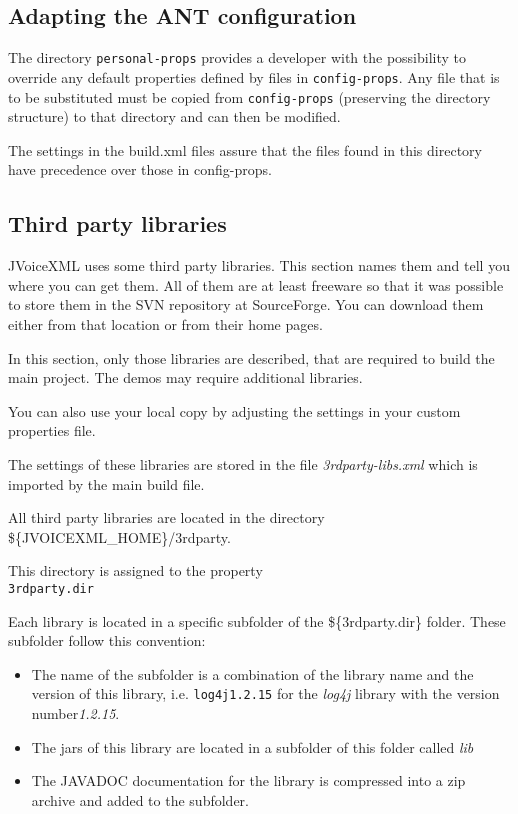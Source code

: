 \documentclass[11pt,a4paper]{article}
\begin{document}
\subsection{Adapting the ANT configuration}

The directory \texttt{personal-props} provides a developer with the 
possibility to override any 
default properties defined by files in \texttt{config-props}. 
Any file that is to be
substituted must be copied from \texttt{config-props} 
(preserving the directory structure) to that directory and can then be 
modified.

The settings in the build.xml files assure that the files
found in this directory have precedence over those in config-props.

\subsection{Third party libraries}
\label{sec:third-party-libr}

JVoiceXML uses some third party libraries. This section names them and tell
you where you can get them. All of them are at least freeware
so that it was possible to store them in the SVN repository at
SourceForge. You can download them either from that location or
from their home pages. 

In this section, only those libraries are described, that are required
to build the main project. The demos may require additional libraries.

You can also use your local copy by adjusting the settings in your
custom properties file.

The settings of these libraries are stored in the file \emph{3rdparty-libs.xml}
which is imported by the main build file.

All third party libraries are located in the directory \\
\$\{JVOICEXML\_HOME\}/3rdparty.

This directory is assigned to the property \\
\texttt{3rdparty.dir}

Each library is located in a specific subfolder of the \$\{3rdparty.dir\}
folder. These subfolder follow this convention:

\begin{itemize}
\item The name of the subfolder is a combination of the library name and
the version of this library, i.e. \texttt{log4j1.2.15} for the \emph{log4j}
library with the version number\emph{1.2.15}.
\item The jars of this library are located in a subfolder of this folder
called \emph{lib}
\item The JAVADOC documentation for the library is compressed into a zip
archive and added to the subfolder.
\end{itemize}
\end{document}
